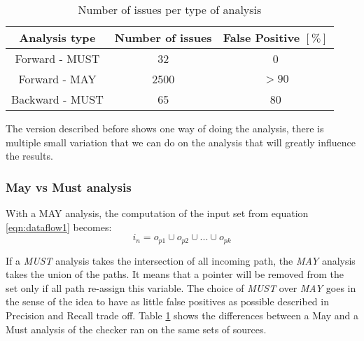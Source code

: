 \begin{table}[h]
	\centering
	\caption{Number of issues per type of analysis}
	\label{table:issue_per_analysis_type}
	\begin{tabular}{|c|c|c|}
		\hline
		\bf Analysis type &  \bf Number of issues &  \bf False Positive $[\%]$ \\ \hline
		Forward - MUST &  32 &  0 \\ 
		Forward - MAY &  2500 & $> 90$  \\ 
		Backward - MUST &  65 & 80 \\ \hline
	\end{tabular}
\end{table}

The version described before shows one way of doing the analysis, there is multiple small variation that we can do on the analysis that will greatly influence the results.

\subsubsection{May vs Must analysis}
\label{subsubsec:may_vs_must}
With a MAY analysis, the computation of the input set from equation \ref{eqn:dataflow1} becomes:
\begin{equation}\label{eqn:mayvsmust}
i_{n} = o_{p1}  \cup   o_{p2}  \cup  ... \cup   o_{pk}
\end{equation}

If a \emph{MUST} analysis takes the intersection of all incoming path, the \emph{MAY} analysis takes the union of the paths. It means that a pointer will be removed from the set only if all path re-assign this variable.
The choice of \emph{MUST} over \emph{MAY} goes in the sense of the idea to have as little false positives as possible described in Precision and Recall trade off.
Table \ref{table:issue_per_analysis_type} shows the differences between a May and a Must analysis of the checker ran on the same sets of sources.

